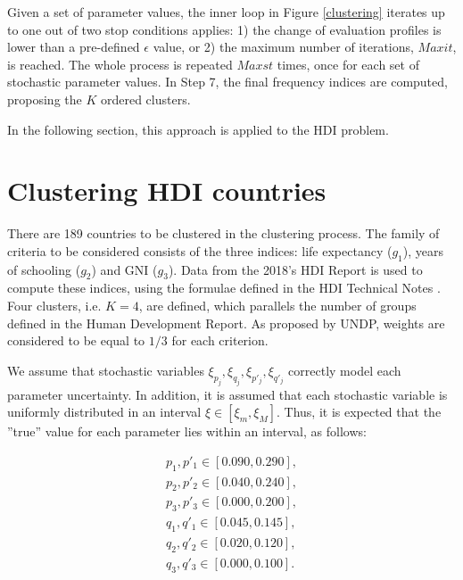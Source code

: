 \documentclass[]{elsarticle}
\theoremstyle{definition}
\begin{document}
Given a set of parameter values, the inner loop in Figure \ref{clustering} iterates up to one out of two stop conditions applies: 1) the change of evaluation profiles is  lower than a pre-defined $\epsilon$ value, or 2) the maximum number of iterations, $Maxit$,  is reached.  The whole process is repeated $Maxst$ times, once for each set of stochastic parameter values. In Step 7, the final frequency indices are computed, proposing the $K$ ordered clusters.


  

In the following section, this approach is applied to the HDI problem.





\section{Clustering HDI countries}\label{application}

There are 189 countries to be clustered in the clustering process. The family of criteria to be considered consists of the three indices: life expectancy ($g_1$), years of schooling ($g_2$) and GNI  ($g_3$).  Data from the 2018's HDI Report is used to compute these indices, using the formulae defined in the HDI Technical Notes \citep{UNDP2019}. Four clusters, i.e. $K=4$, are defined, which parallels the number of groups defined in the Human Development Report.  As proposed by UNDP, weights are considered to be equal to $1/3$ for each criterion.

We assume that stochastic variables $\xi_{p_j},\xi_{q_j},\xi_{p'_j},\xi_{q'_j}$ correctly model each parameter uncertainty. In addition, it is assumed that each stochastic variable is uniformly distributed in an interval  $\xi \in [\xi_m, \xi_M]$. Thus, it is expected that the ''true'' value for each parameter lies within an interval, as follows:

\begin{eqnarray}
p_1,p'_1 \in [0.090, 0.290], \nonumber\\
p_2,p'_2 \in [0.040, 0.240], \nonumber\\
p_3,p'_3 \in [0.000, 0.200], \nonumber\\
q_1,q'_1 \in [0.045, 0.145], \nonumber\\
q_2,q'_2 \in [0.020, 0.120], \nonumber\\
q_3,q'_3 \in [0.000, 0.100]. \nonumber
\end{eqnarray}
\end{document}
